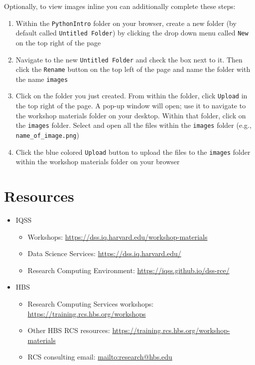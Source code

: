 \documentclass[]{book}
\providecommand{\tightlist}{%
  \setlength{\itemsep}{0pt}\setlength{\parskip}{0pt}}
\begin{document}
Optionally, to view images inline you can additionally complete these
steps:

\begin{enumerate}
\def\labelenumi{\arabic{enumi}.}
\setcounter{enumi}{6}
\tightlist
\item
  Within the \texttt{PythonIntro} folder on your browser, create a new
  folder (by default called \texttt{Untitled\ Folder}) by clicking the
  drop down menu called \texttt{New} on the top right of the page
\item
  Navigate to the new \texttt{Untitled\ Folder} and check the box next
  to it. Then click the \texttt{Rename} button on the top left of the
  page and name the folder with the name \texttt{images}
\item
  Click on the folder you just created. From within the folder, click
  \texttt{Upload} in the top right of the page. A pop-up window will
  open; use it to navigate to the workshop materials folder on your
  desktop. Within that folder, click on the \texttt{images} folder.
  Select and open all the files within the \texttt{images} folder (e.g.,
  \texttt{name\_of\_image.png})
\item
  Click the blue colored \texttt{Upload} button to upload the files to
  the \texttt{images} folder within the workshop materials folder on
  your browser
\end{enumerate}

\section{Resources}\label{resources-6}

\begin{itemize}
\tightlist
\item
  IQSS

  \begin{itemize}
  \tightlist
  \item
    Workshops: \url{https://dss.iq.harvard.edu/workshop-materials}
  \item
    Data Science Services: \url{https://dss.iq.harvard.edu/}
  \item
    Research Computing Environment:
    \url{https://iqss.github.io/dss-rce/}
  \end{itemize}
\item
  HBS

  \begin{itemize}
  \tightlist
  \item
    Research Computing Services workshops:
    \url{https://training.rcs.hbs.org/workshops}
  \item
    Other HBS RCS resources:
    \url{https://training.rcs.hbs.org/workshop-materials}
  \item
    RCS consulting email: \url{mailto:research@hbs.edu}
  \end{itemize}
\end{itemize}
\end{document}
